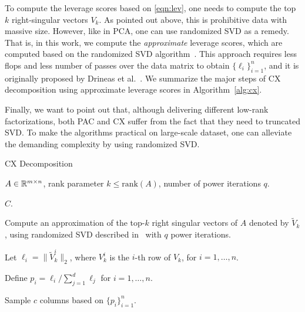 To compute the leverage scores based on \eqref{eqn:lev}, one needs to compute the top $k$ right-singular vectors $V_k$. As pointed out above, this is prohibitive data with massive size.
However, like in PCA, one can use randomized SVD as a remedy.
That is, in this work, we compute the {\it approximate} leverage scores, which are computed based on the randomized SVD algorithm~\cite{HMT09_SIREV}.
This approach requires less flops and less number of passes over the data matrix to obtain $\{\ell_i\}_{i=1}^n$, and it is originally proposed by Drineas et al.~\cite{DMMW12_JMLR}.
We summarize the major steps of CX decomposition using approximate leverage scores in Algorithm~\ref{alg:cx}.

Finally, we want to point out that,
although delivering different low-rank factorizations, both PAC and CX suffer from the fact that they need to truncated SVD.
To make the algorithms practical on large-scale dataset, one can alleviate the demanding complexity by using randomized SVD. 


 \begin{algorithm}[tb]
 \caption{CX Decomposition}
  \label{alg:cx}
  \begin{algorithmic}[1]
    \Require $A \in \mathbb{R}^{m\times n}$, rank parameter $k \leq \textrm{rank}(A)$, number of power iterations $q$.

    \Ensure $C$.
    

    \State Compute an approximation of the top-$k$ right singular vectors of $A$ denoted by $\tilde V_k$, using randomized SVD described in~\cite{HMT09_SIREV} with $q$ power iterations.
    
    \State Let $\ell_i = \| \tilde V_k^i\|_2$, where $V_k^i$ is the $i$-th row of $V_k$, for $i = 1, \ldots, n$. 
    
    \State Define $p_i = \ell_i / \sum_{j=1}^d \ell_j$ for $i=1,\ldots,n$.
    
    \State Sample $c$ columns based on $\{p_i\}_{i=1}^n$.

    

    \end{algorithmic}
\end{algorithm}



